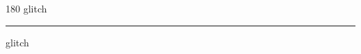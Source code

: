 
\begin{frame}
\begin{center}
\begin{turn}{180}
{\fontsize{2.5cm}{1em}\selectfont glitch}
\end{turn}
\vspace{1em}\par  
\hrule
\vspace{1em}\par  
{\fontsize{2.5cm}{1em}\selectfont glitch}
\end{center}
\end{frame}
